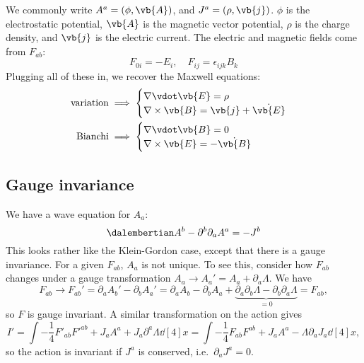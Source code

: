 \documentclass{jknotes} %
\begin{document}
We commonly write \(A^a = (\phi,\vb{A})\), and \(J^a = (\rho,\vb{j})\). \(\phi\) is the electrostatic potential, \(\vb{A}\) is the magnetic vector potential, \(\rho\) is the charge density, and \(\vb{j}\) is the electric current. The electric and magnetic fields come from \(F_{ab}\):
\begin{equation}
    F_{0i} = -E_i,\quad F_{ij} = \epsilon_{ijk}B_k
\end{equation}
Plugging all of these in, we recover the Maxwell equations:
\begin{align}
    \text{variation} &\implies 
    \begin{cases}
        \nabla\vdot\vb{E} = \rho \\
        \nabla\times\vb{B} = \vb{j}+\dot{\vb{E}}
    \end{cases} \\
    \text{Bianchi} &\implies
    \begin{cases}
        \nabla\vdot\vb{B} = 0 \\
        \nabla\times\vb{E} = -\dot{\vb{B}}
    \end{cases}
\end{align}

\subsection{Gauge invariance}
We have a wave equation for \(A_a\):
\begin{equation}
    \dalembertian A^b - \partial^b\partial_a A^a = -J^b
\end{equation}
This looks rather like the Klein-Gordon case, except that there is a gauge invariance. For a given \(F_{ab}\), \(A_a\) is not unique. To see this, consider how \(F_{ab}\) changes under a gauge transformation \(A_a \to A_a'=A_a + \partial_a\Lambda\). We have
\begin{equation}
    F_{ab} \to F_{ab}' = \partial_a A_b' - \partial_b A_a' = \partial_a A_b - \partial_b A_a + \underbrace{\partial_a\partial_b\Lambda - \partial_b\partial_a\Lambda}_{=0} = F_{ab},
\end{equation}
so \(F\) is gauge invariant. A similar transformation on the action gives
\begin{equation}
    I' = \int -\frac{1}{4}F'_{ab}F'^{ab} + J_a A^a + J_a \partial^a\Lambda \dd[4]{x} = \int -\frac{1}{4}F_{ab}F^{ab} + J_a A^a - \Lambda\partial_aJ_a\dd[4]{x},
\end{equation}
so the action is invariant if \(J^a\) is conserved, i.e.\ \(\partial_a J^a=0\).
\end{document}
